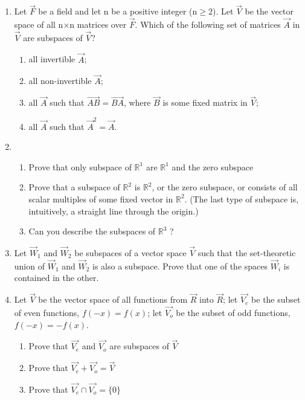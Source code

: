 \begin{enumerate}[label=\thesubsection.\arabic*.,ref=\thesubsection.\theenumi]
\solution

\item Let $\vec{F}$ be a field and let n be a positive integer (n$\geq$2). Let $\vec{V}$ be the vector space of all n$\times$n matrices over $\vec{F}$. Which of the following set of matrices $\vec{A}$ in $\vec{V}$ are subspaces of   $\vec{V}$?
\begin{enumerate}
\item all invertible $\vec{A}$;
\item all non-invertible $\vec{A}$;
\item all $\vec{A}$ such that $\vec{AB}=\vec{BA}$, where $\vec{B}$ is some fixed matrix in $\vec{V}$;
\item all $\vec{A}$ such that $\vec{A}^2 = \vec{A}$.
\end{enumerate}
%
\solution

%
\item 
\begin{enumerate}[label=\alph*.]
    \item Prove that only subspace of $\mathbb{R}^1$ are $\mathbb{R}^1$ and the zero subspace 
    \item Prove that a subspace of $\mathbb{R}^2$ is $\mathbb{R}^2$, or the zero subspace, or consists of all scalar multiples of some fixed vector in $\mathbb{R}^2$. (The last type of subspace is, intuitively,
a straight line through the origin.)
	\item Can you describe the subspaces of $\mathbb{R}^3$ ?
\end{enumerate}
%
\solution

%
\item Let $\vec{W}_1$ and $\vec{W}_2$ be subspaces of a vector space $\vec{V}$ such that the set-theoretic union of $\vec{W}_1$ and $\vec{W}_2$ is also a subspace. Prove that one of the spaces $\vec{W}_i$ is contained in the other.
%
\solution

\item Let $\vec{V}$ be the  vector space of all functions from $\vec{R}$ into $\vec{R}$; let $\vec{V_e}$ be the subset of even functions, $f(-x) = f(x)$; let $\vec{V_o}$ be the subset of odd functions, $f(-x) = -f(x)$.
\begin{enumerate}
   \item Prove that $\vec{V_e}$ and $\vec{V_o}$ are subspaces of $\vec{V}$
   \item Prove that $\vec{V_e} + \vec{V_o} = \vec{V}$
    \item Prove that $\vec{V_e} \cap \vec{V_o} = \{0\}$
 \end{enumerate}

\end{enumerate}
